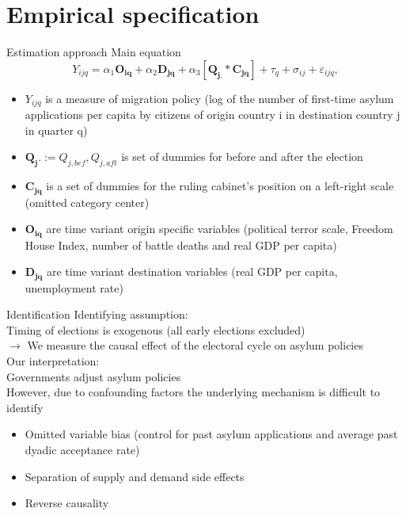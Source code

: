 \documentclass{beamer}
\begin{document}
\section{Empirical specification}
    \begin{frame}{Estimation approach}
Main equation
\begin{equation}
Y_{ijq} =\alpha_1 \mathbf{O_{iq}} + \alpha_2 \mathbf{D_{jq}} + \alpha_3 [\mathbf{Q_{j.}} *  \mathbf{C_{jq}}] + \tau_q + \sigma_{ij} +  \varepsilon_{ijq},
\end{equation}
\vspace{-2ex}
\begin{itemize}
\item $Y_{ijq}$ is a measure of migration policy (log of the number of first-time asylum applications per capita by citizens of origin country i in destination country j in quarter q)
\item $\mathbf{Q_j.} := Q_{j,bef}, Q_{j,aft}$ is set of dummies for before and after the election
\item $\mathbf{C_{jq}}$ is a set of dummies for the ruling cabinet's position on a left-right scale (omitted category center)
\item $\mathbf{O_{iq}}$ are time variant origin specific variables (political terror scale, Freedom House Index, number of battle deaths and real GDP per capita) 
\item $\mathbf{D_{jq}}$  are time variant destination variables (real GDP per capita, unemployment rate)
\end{itemize}
    \end{frame}
    \begin{frame}{Identification}
Identifying assumption:\\[1ex]
Timing of elections is exogenous (all early elections excluded)\\\vspace{.2cm}
$\rightarrow$ We measure the causal effect of the electoral cycle on asylum policies 
\\\vspace{.4cm}
Our interpretation:\\[1ex]
Governments adjust asylum policies 
\\\vspace{.4cm}
However, due to confounding factors the underlying mechanism is difficult to identify\\[1ex] 
\begin{itemize}
\item Omitted variable bias (control for past asylum applications and average past dyadic acceptance rate)\\[1ex] 
\item Separation of supply and demand side effects\\[1ex]
\item Reverse causality
\end{itemize}
	\end{frame}
	
\end{document}

